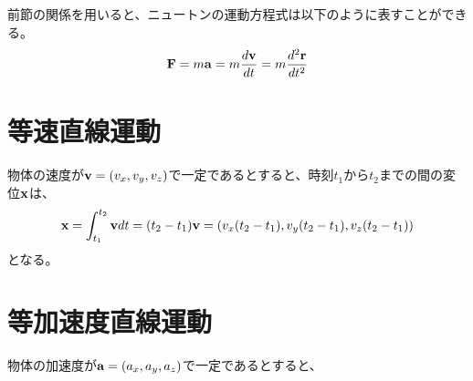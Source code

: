 \documentclass{ltjsreport}
\begin{document}
前節の関係を用いると、ニュートンの運動方程式は以下のように表すことができる。
\begin{equation}
    \vb{F} = m\vb{a} = m\frac{d\vb{v}}{dt} = m\frac{d^2\vb{r}}{dt^2}
\end{equation}

\section{等速直線運動}

物体の速度が$\vb{v}=(v_x,v_y,v_z)$で一定であるとすると、時刻$t_1$から$t_2$までの間の変位$\vb{x}$は、
\begin{equation}
    \vb{x} = \int_{t_1}^{t_2}\vb{v}dt = (t_2-t_1)\vb{v} = (v_x(t_2-t_1),v_y(t_2-t_1),v_z(t_2-t_1))
\end{equation}
となる。

\section{等加速度直線運動}

物体の加速度が$\vb{a}=(a_x,a_y,a_z)$で一定であるとすると、
\end{document}
